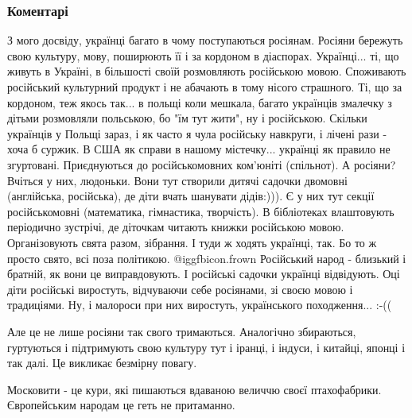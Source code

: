 
 
 
 
 
\subsubsection{Коментарі}
\label{sec:26_10_2021.fb.fb_group.ukrainci_rozmov_ukrainskoju.1.moskvyny.cmt}

\begin{itemize} %

З мого досвіду, українці багато в чому поступаються росіянам. Росіяни бережуть
свою культуру, мову, поширюють її і за кордоном в діаспорах. Українці... ті, що
живуть в Україні, в більшості своїй розмовляють російською мовою. Споживають
російський культурний продукт і не абачають в тому нісого страшного. Ті, що за
кордоном, теж якось так... в польщі коли мешкала, багато українців змалечку з
дітьми розмовляли польською, бо "їм тут жити", ну і російською. Скільки
українців у Польщі зараз, і як часто я чула російську навкруги, і лічені рази -
хоча б суржик. В США як справи в нашому містечку... українці як правило не
згуртовані. Приєднуються до російськомовних ком'юніті (спільнот). А росіяни?
Вчіться у них, людоньки. Вони тут створили дитячі садочки двомовні (англійська,
російська), де діти вчать шанувати дідів:))). Є у них тут секції російськомовні
(математика, гімнастика, творчість). В бібліотеках влаштовують періодично
зустрічі, де діточкам читають книжки російською мовою. Організовують свята
разом, зібрання. І туди ж ходять українці, так. Бо то ж просто свято, всі поза
політикою. @igg{fbicon.frown}  Російський народ - близький і братній, як вони
це виправдовують. І російські садочки українці відвідують. Оці діти російські
виростуть, відчуваючи себе росіянами, зі своєю мовою і традиціями. Ну, і
малороси при них виростуть, українського походження... :-((

Але це не лише росіяни так свого тримаються. Аналогічно збираються, гуртуються
і підтримують свою культуру тут і іранці, і індуси, і китайці, японці і так
далі. Це викликає безмірну повагу.


Московити - це кури, які пишаються вдаваною величчю своєї птахофабрики.
Європейським народам це геть не притаманно.


\end{itemize}
